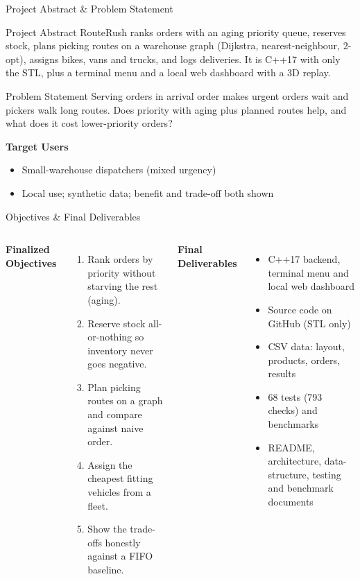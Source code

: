 \documentclass[aspectratio=169,11pt]{beamer}
\begin{document}
\begin{frame}{Project Abstract \& Problem Statement}
\footnotesize
\begin{block}{Project Abstract}
\small RouteRush ranks orders with an aging priority queue, reserves stock, plans picking routes on a warehouse graph (Dijkstra, nearest-neighbour, 2-opt), assigns bikes, vans and trucks, and logs deliveries. It is C++17 with only the STL, plus a terminal menu and a local web dashboard with a 3D replay.
\end{block}
\begin{block}{Problem Statement}
\small Serving orders in arrival order makes urgent orders wait and pickers walk long routes. Does priority with aging plus planned routes help, and what does it cost lower-priority orders?
\end{block}
\textbf{\color{GEUBlue}Target Users}
\begin{itemize}\itemsep2pt
    \item Small-warehouse dispatchers (mixed urgency)
    \item Local use; synthetic data; benefit and trade-off both shown
\end{itemize}
\end{frame}

\begin{frame}{Objectives \& Final Deliverables}
\footnotesize
\begin{columns}[T,totalwidth=\textwidth]
\textbf{\color{GEUBlue}Finalized Objectives}
\begin{enumerate}\itemsep3pt
    \item Rank orders by priority without starving the rest (aging).
    \item Reserve stock all-or-nothing so inventory never goes negative.
    \item Plan picking routes on a graph and compare against naive order.
    \item Assign the cheapest fitting vehicles from a fleet.
    \item Show the trade-offs honestly against a FIFO baseline.
\end{enumerate}
\textbf{\color{GEUBlue}Final Deliverables}
\begin{itemize}\itemsep3pt
    \item C++17 backend, terminal menu and local web dashboard
    \item Source code on GitHub (STL only)
    \item CSV data: layout, products, orders, results
    \item 68 tests (793 checks) and benchmarks
    \item README, architecture, data-structure, testing and benchmark documents
\end{itemize}
\end{columns}
\vfill
\end{frame}
\end{document}
